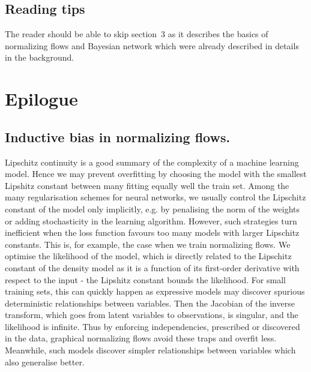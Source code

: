 \subsection{Reading tips}
The reader should be able to skip section~3 as it describes the basics of normalizing flows and Bayesian network which were already described in details in the background.



\section{Epilogue}

\subsection{Inductive bias in normalizing flows.}
Lipschitz continuity is a good summary of the complexity of a machine learning model. Hence we may prevent overfitting by choosing the model with the smallest Lipshitz constant between many fitting equally well the train set. Among the many regularisation schemes for neural networks, we usually control the Lipschitz constant of the model only implicitly, e.g. by penalising the norm of the weights or adding stochasticity in the learning algorithm. However, such strategies turn inefficient when the loss function favours too many models with larger Lipschitz constants. This is, for example, the case when we train normalizing flows. We optimise the likelihood of the model, which is directly related to the Lipschitz constant of the density model as it is a function of its first-order derivative with respect to the input - the Lipshitz constant bounds the likelihood. For small training sets, this can quickly happen as expressive models may discover spurious deterministic relationships between variables. Then the Jacobian of the inverse transform, which goes from latent variables to observations, is singular, and the likelihood is infinite. Thus by enforcing independencies, prescribed or discovered in the data, graphical normalizing flows avoid these traps and overfit less. Meanwhile, such models discover simpler relationships between variables which also generalise better.

